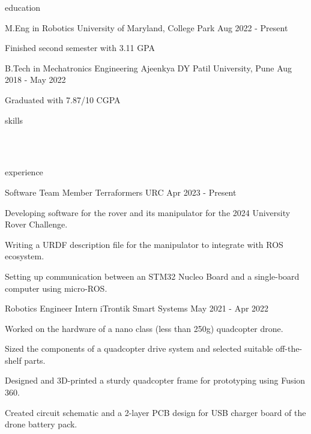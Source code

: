 \documentclass[12pt, a4paper]{eon-resume}
\begin{document}
\begin{section}{education}

  \begin{school}
    {M.Eng in Robotics}
    {University of Maryland, College Park}
    {Aug 2022 - Present}
    
    \item Finished second semester with 3.11 GPA
    
  \end{school}

  \begin{school}
    {B.Tech in Mechatronics Engineering}
    {Ajeenkya DY Patil University, Pune}
    {Aug 2018 - May 2022}

    \item Graduated with 7.87/10 CGPA

  \end{school}

\end{section}

\begin{section}{skills}

   \\
   \\
  
\end{section}

\begin{section}{experience}

  \begin{work}
    {Software Team Member}
    {Terraformers URC}
    {}
    {Apr 2023 - Present}

    \item Developing software for the rover and its manipulator for the 2024 University Rover Challenge.
    \item Writing a URDF description file for the manipulator to integrate with ROS ecosystem.
    \item Setting up communication between an STM32 Nucleo Board and a single-board computer using micro-ROS.
  
  \end{work}

  \begin{work}
    {Robotics Engineer Intern}
    {iTrontik Smart Systems}
    {}
    {May 2021 - Apr 2022}

    \item Worked on the hardware of a nano class (less than 250g) quadcopter drone.
    \item Sized the components of a quadcopter drive system and selected suitable off-the-shelf parts.
    \item Designed and 3D-printed a sturdy quadcopter frame for prototyping using Fusion 360.
    \item Created circuit schematic and a 2-layer PCB design for USB charger board of the drone battery pack.
  
  \end{work}

\end{section}
\end{document}
